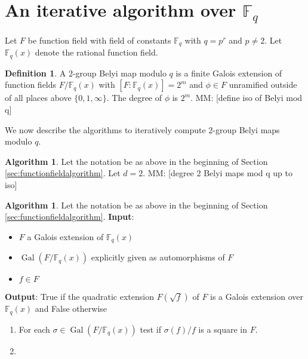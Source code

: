 \documentclass{dcthesis}
\newcommand{\defi}[1]{\textsf{#1}}
\newcommand{\mm}[1]{{\color{blue} \sf MM: [#1]}}
\newcommand{\FF}{\mathbb{F}}
\DeclareMathOperator{\Gal}{Gal}
\numberwithin{equation}{section}
\theoremstyle{definition}
\newtheorem{definition}[equation]{Definition}
\newtheorem{alg}[equation]{Algorithm}
\theoremstyle{remark}
\begin{document}
{  \section{An iterative algorithm over $\FF_q$}{\label{sec:functionfieldalgorithm}
    Let $F$ be function field
    with field of constants
    $\FF_q$ with $q=p^r$ and $p\neq 2$.
    Let $\FF_q(x)$ denote the rational
    function field.
    \begin{definition}
      \label{def:pgroupbelyimapmodq}
      A \defi{$2$-group Belyi map modulo $q$}
      is a finite Galois extension of
      function fields
      $F/\FF_q(x)$ with
      $[F:\FF_q(x)]=2^m$
      and $\phi\in F$
      unramified outside of
      all places above $\{0,1,\infty\}$.
      The \defi{degree} of $\phi$
      is $2^m$.
      \mm{define iso of Belyi mod q}
    \end{definition}
    We now describe the algorithms
    to iteratively compute $2$-group Belyi maps
    modulo $q$.
    \begin{alg}
      \label{alg:degree2FF}
      Let the notation be
      as above in the beginning of
      Section
      \ref{sec:functionfieldalgorithm}.
      Let $d=2$.
      \mm{degree 2 Belyi maps mod q up to iso}
    \end{alg}
    \begin{alg}
      \label{alg:isgalois}
      Let the notation be
      as above in the beginning of
      Section
      \ref{sec:functionfieldalgorithm}.
      \newline
      \textbf{Input}:
      \begin{itemize}
        \item
          $F$ a Galois extension of
          $\FF_q(x)$
        \item
          $\Gal(F/\FF_q(x))$
          explicitly given
          as automorphisms of $F$
        \item
          $f\in F$
      \end{itemize}
      \textbf{Output}:
      True if the quadratic extension
      $F(\sqrt{f})$ of $F$
      is a Galois extension over $\FF_q(x)$
      and False otherwise
      \begin{enumerate}
        \item
          For each $\sigma\in\Gal(F/\FF_q(x))$
          test if $\sigma(f)/f$ is a square
          in $F$.
        \item

\end{enumerate}
\end{alg}}}
\end{document}
